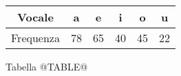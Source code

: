 \begin{tabular}{ | c | c | c | c | c | c | }
\hline
Vocale & a & e & i & o & u \\
\hline
Frequenza & 78 & 65 & 40 & 45 & 22 \\
\hline
\end{tabular}
\vspace{.1cm}

Tabella @TABLE@
\vspace{.2cm}
